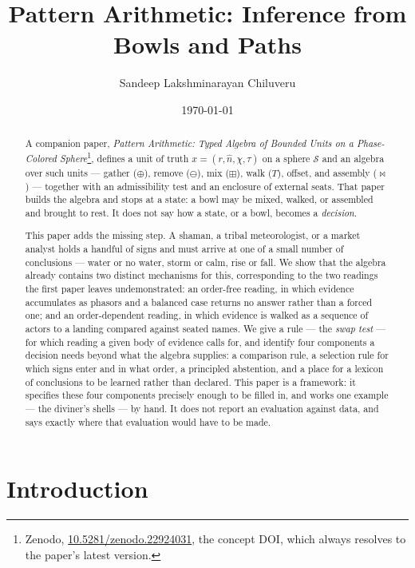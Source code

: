 \documentclass[12pt, a4paper]{article}
\title{Pattern Arithmetic: Inference from Bowls and Paths}
\author{Sandeep Lakshminarayan Chiluveru}
\date{\today}
\begin{document}
\maketitle

\begin{abstract}
A companion paper, \emph{Pattern Arithmetic: Typed Algebra of Bounded
Units on a Phase-Colored Sphere}\footnote{Zenodo,
\href{https://doi.org/10.5281/zenodo.22924031}{10.5281/zenodo.22924031},
the concept DOI, which always resolves to the paper's latest
version.}, defines a unit of truth
$x=(r,\hat n,\chi,\tau)$ on a sphere $\mathcal{S}$ and an algebra over
such units --- gather ($\oplus$), remove ($\ominus$), mix ($\boxplus$),
walk ($T$), offset, and assembly ($\bowtie$) --- together with an
admissibility test and an enclosure of external seats. That paper
builds the algebra and stops at a state: a bowl may be mixed, walked,
or assembled and brought to rest. It does not say how a
state, or a bowl, becomes a \emph{decision}.

This paper adds the missing step. A shaman, a tribal meteorologist, or
a market analyst holds a handful of signs and must arrive at one of a
small number of conclusions --- water or no water, storm or calm, rise
or fall. We show that the algebra already contains two distinct
mechanisms for this, corresponding to the two readings the first paper
leaves undemonstrated: an order-free reading, in which evidence
accumulates as phasors and a balanced case returns no answer rather
than a forced one; and an order-dependent reading, in which evidence
is walked as a sequence of actors to a landing compared against
seated names. We give a rule --- the \emph{swap test} --- for which
reading a given body of evidence calls for, and identify four
components a decision needs beyond what the algebra supplies: a
comparison rule, a selection rule for which signs enter and in what
order, a principled abstention, and a place for a lexicon of
conclusions to be learned rather than declared. This paper is a
framework: it specifies these four components precisely enough to be
filled in, and works one example --- the diviner's shells --- by hand.
It does not report an evaluation against data, and says exactly where
that evaluation would have to be made.
\end{abstract}

\section{Introduction}
\label{sec:intro}
\end{document}
